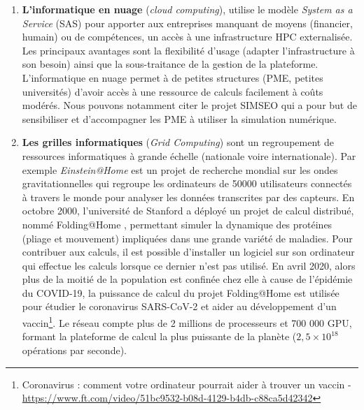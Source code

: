 \begin{enumerate}
        \item \textbf{L'informatique en nuage} (\textit{cloud computing}),  utilise le modèle \textit{System as a Service} (SAS) pour apporter aux entreprises manquant de moyens (financier, humain) ou de compétences, un accès à une infrastructure HPC externalisée. Les principaux avantages sont la flexibilité d'usage (adapter l'infrastructure à son besoin) ainsi que la sous-traitance de la gestion de la plateforme. L'informatique en nuage permet à de petites structures (PME, petites universités) d'avoir accès à une ressource de calculs facilement à coûts modérés. Nous pouvons notamment citer le projet SIMSEO \cite{Saguez2016} qui a pour but de sensibiliser et d'accompagner les PME à utiliser la simulation numérique. %
        
        \item \textbf{Les grilles informatiques} (\textit{Grid Computing}) sont un regroupement de ressources informatiques à grande échelle (nationale voire internationale). Par exemple \textit{Einstein@Home} \cite{Abbott2009} est un projet de recherche mondial sur les ondes gravitationnelles  qui regroupe les ordinateurs de 50000 utilisateurs connectés à travers le monde pour analyser les données transcrites par des capteurs. En octobre 2000, l'université de Stanford a déployé un projet de calcul distribué, nommé Folding@Home \cite{Larson2009}, permettant simuler la dynamique des protéines (pliage et mouvement) impliquées dans une grande variété de maladies. Pour contribuer aux calculs, il est possible d'installer un logiciel sur son ordinateur qui effectue les calculs lorsque ce dernier n'est pas utilisé. En avril 2020, alors plus de la moitié de la population est confinée chez elle à cause de l'épidémie du COVID-19, la puissance de calcul du projet Folding@Home est utilisée pour étudier le coronavirus SARS-CoV-2 et aider au développement d'un vaccin\footnote{Coronavirus : comment votre ordinateur pourrait aider à trouver un vaccin - \url{https://www.ft.com/video/51bc9532-b08d-4129-b4db-c88ca5d42342}}. Le réseau compte plus de 2 millions de processeurs et  700 000 GPU, formant la plateforme de calcul la plus puissante de la planète ($2,5 \times 10^{18}$ opérations par seconde). 
        
    \end{enumerate}
        
